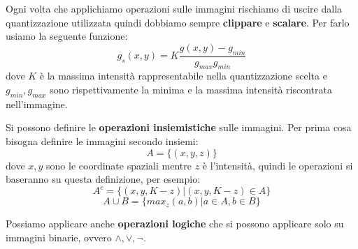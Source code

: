 Ogni volta che applichiamo operazioni sulle immagini rischiamo di uscire dalla
quantizzazione utilizzata quindi dobbiamo sempre \textbf{clippare} e \textbf{scalare}.
Per farlo usiamo la seguente funzione:
\begin{equation}
    g_s(x,y) = K\frac{g(x,y) -g_{min}}{g_{max} g_{min}}
\end{equation}
dove $K$ è la massima intensità rappresentabile nella quantizzazione scelta e
$g_{min}, g_{max}$ sono rispettivamente la minima e la massima intensità riscontrata
nell'immagine.

Si possono definire le \textbf{operazioni insiemistiche} sulle immagini. Per
prima cosa bisogna definire le immagini secondo insiemi:
\begin{equation}
    A = \{ (x,y,z) \}
\end{equation}
dove $x,y$ sono le coordinate spaziali mentre $z$ è l'intensità, quindi le operazioni
si baseranno su questa definizione, per esempio:
\begin{equation}
    A^c=\{(x,y, K-z) |(x,y, K-z) \in A\}
\end{equation}
\begin{equation}
    A\cup B=\{max_z(a,b) |a \in A, b\in B\}
\end{equation}

Possiamo applicare anche \textbf{operazioni logiche} che si possono applicare solo
su immagini binarie, ovvero $\land, \lor, \lnot$.

